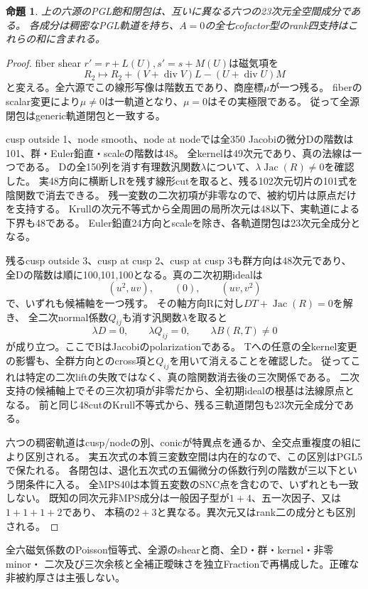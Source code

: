 \documentclass[a4paper,11pt]{ltjsarticle}
\newtheorem{proposition}{命題}[section]
\theoremstyle{definition}
\begin{document}
\begin{proposition}\label{prop:plane-conic-cubic-six}
上の六源のPGL飽和閉包は、互いに異なる六つの23次元全空間成分である。
各成分は稠密なPGL軌道を持ち、$A=0$の全七cofactor型のrank四支持はこれらの和に含まれる。
\end{proposition}
\begin{proof}
fiber shear $r'=r+L(U),s'=s+M(U)$は磁気項を
\[
 R_2\longmapsto R_2+(V+\operatorname{div}V)L-(U+\operatorname{div}U)M
\]
と変える。全六源でこの線形写像は階数五であり、商座標$\mu$が一つ残る。
fiberのscalar変更により$\mu\ne0$は一軌道となり、$\mu=0$はその実極限である。
従って全源閉包はgeneric軌道閉包と一致する。

cusp outside 1、node smooth、node at nodeでは全350 Jacobiの微分Dの階数は101、群・Euler鉛直・scaleの階数は48。
全kernelは49次元であり、真の法線は一つである。
Dの全150列を消す有理数汎関数$\lambda$について、$\lambda\operatorname{Jac}(R)\ne0$を確認した。
実48方向に横断しRを残す線形cutを取ると、残る102次元切片の101式を陰関数で消去できる。
残一変数の二次初項が非零なので、被約切片は原点だけを支持する。
Krullの次元不等式から全周囲の局所次元は48以下、実軌道による下界も48である。
Euler鉛直24方向とscaleを除き、各軌道閉包は23次元全成分となる。

残るcusp outside 3、cusp at cusp 2、cusp at cusp 3も群方向は48次元であり、
全Dの階数は順に100,101,100となる。真の二次初期idealは
\[
 (u^2,uv),\qquad (0),\qquad (uv,v^2)
\]
で、いずれも候補軸を一つ残す。
その軸方向Rに対し$DT+\operatorname{Jac}(R)=0$を解き、
全二次normal係数$Q_{ij}$も消す汎関数$\lambda$を取ると
\[
 \lambda D=0,\qquad\lambda Q_{ij}=0,\qquad
 \lambda B(R,T)\ne0
\]
が成り立つ。ここでBはJacobiのpolarizationである。
Tへの任意の全kernel変更の影響も、全群方向とのcross項と$Q_{ij}$を用いて消えることを確認した。
従ってこれは特定の二次liftの失敗ではなく、真の陰関数消去後の三次関係である。
二次支持の候補軸上でその三次初項が非零だから、全初期idealの根基は法線原点となる。
前と同じ48cutのKrull不等式から、残る三軌道閉包も23次元全成分である。

六つの稠密軌道はcusp/nodeの別、conicが特異点を通るか、全交点重複度の組により区別される。
実五次式の本質三変数空間は内在的なので、この区別はPGL5で保たれる。
各閉包は、退化五次式の五偏微分の係数行列の階数が三以下という閉条件に入る。
全MPS40は本質五変数のSNC点を含むので、いずれとも一致しない。
既知の同次元非MPS成分は一般因子型が$1+4$、五一次因子、又は$1+1+1+2$であり、
本稿の$2+3$と異なる。異次元又はrank二の成分とも区別される。
\end{proof}
全六磁気係数のPoisson恒等式、全源のshearと商、全D・群・kernel・非零minor・
二次及び三次余核と全補正曖昧さを独立Fractionで再構成した。正確な非被約厚さは主張しない。
\end{document}

